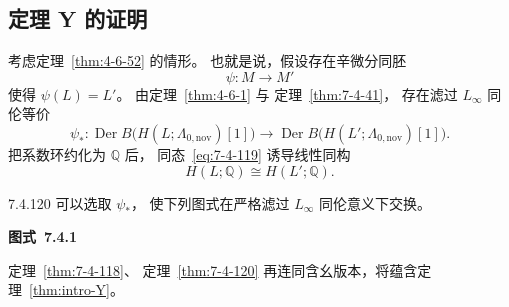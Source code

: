 
\subsection{定理 Y 的证明}
\label{subsec:7-4-6}

考虑定理~\ref{thm:4-6-52} 的情形。
也就是说，假设存在辛微分同胚
\[
\psi\colon M\longrightarrow M'
\]
使得 $\psi(L)=L'$。
由定理~\ref{thm:4-6-1} 与
定理~\ref{thm:7-4-41}，
存在滤过 $L_\infty$ 同伦等价
\begin{equation}
\psi_*\colon
\operatorname{Der}B
\bigl(H(L;\Lambda_{0,\mathrm{nov}})[1]\bigr)
\longrightarrow
\operatorname{Der}B
\bigl(H(L';\Lambda_{0,\mathrm{nov}})[1]\bigr).
\tag{7.4.119}\label{eq:7-4-119}
\end{equation}
把系数环约化为 $\mathbb Q$ 后，
同态~\eqref{eq:7-4-119}
诱导线性同构
\[
H(L;\mathbb Q)\cong H(L';\mathbb Q).
\]

\begin{theorem}{7.4.120}\label{thm:7-4-120}
可以选取 $\psi_*$，
使下列图式在严格滤过 $L_\infty$ 同伦意义下交换。

\par\medskip\noindent\begin{minipage}{\textwidth}
\centering
{}
\par\smallskip
{\renewcommand{\thefigure}{7.4.1}
\normalfont\bfseries 图式~\thefigure\label{diag:7-4-1}}
\end{minipage}\par\medskip
\end{theorem}

定理~\ref{thm:7-4-118}、
定理~\ref{thm:7-4-120}
再连同含幺版本，将蕴含定理~\ref{thm:intro-Y}。

